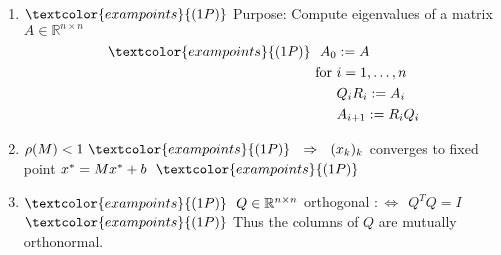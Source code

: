 {\begin{enumerate}
	\item 
	$\textcolor{exampoints}{(1P)}$ Purpose: Compute eigenvalues of a matrix $A\in\mathbb{R}^{n\times n}$
	\begin{align*}
	\textcolor{exampoints}{(1P)}~~A_0&:=A\\
	\text{for}~&i=1,\dots,n\\
	&Q_iR_i:=A_i\\
	&A_{i+1}:=R_iQ_i
	\end{align*}
	\item $\rho(M)<1~\textcolor{exampoints}{(1P)}~~\Rightarrow~~(x_k)_k$ converges to fixed point $x^*=Mx^*+b~~\textcolor{exampoints}{(1P)}$
	\item $\textcolor{exampoints}{(1P)}~~Q\in\mathbb{R}^{n\times n}$ orthogonal $:\Leftrightarrow~~Q^TQ=I$\\
	$\textcolor{exampoints}{(1P)}$ 
	Thus the columns of $Q$ are mutually orthonormal.
\end{enumerate}
}
